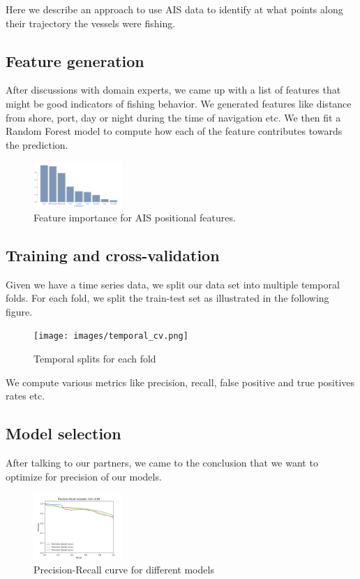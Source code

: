 Here we describe an approach to use AIS data to identify at what points along their trajectory the vessels were fishing.

\subsection{Feature generation}

After discussions with domain experts, we came up with a list of features that might be good indicators of fishing behavior.
We generated features like distance from shore, port, day or night during the time of navigation etc. We then fit a Random Forest model to compute how each of the feature contributes towards the prediction.

\begin{figure}[H]
\centering
\includegraphics[width=0.3\textwidth]{images/feature_importance_final.png}
\caption{\label{fig:Feature importance}Feature importance for AIS positional features.}
\end{figure}

\subsection{Training and cross-validation}

Given we have a time series data, we split our data set into multiple temporal folds. For each fold, we split the train-test set as illustrated in the following figure.

\begin{figure}[H]
\centering
\texttt{[image: images/temporal\_cv.png]}
\caption{\label{fig:Temporal Cross-validation}Temporal splits for each fold}
\end{figure}

We compute various metrics like precision, recall, false positive and true positives rates etc.

\subsection{Model selection}
After talking to our partners, we came to the conclusion that we want to optimize for precision of our models.

\begin{figure}[H]
\centering
\includegraphics[width=0.3\textwidth]{images/precision_recall_curve.png}
\caption{\label{fig:Precision-Recall}Precision-Recall curve for different models}
\end{figure}

